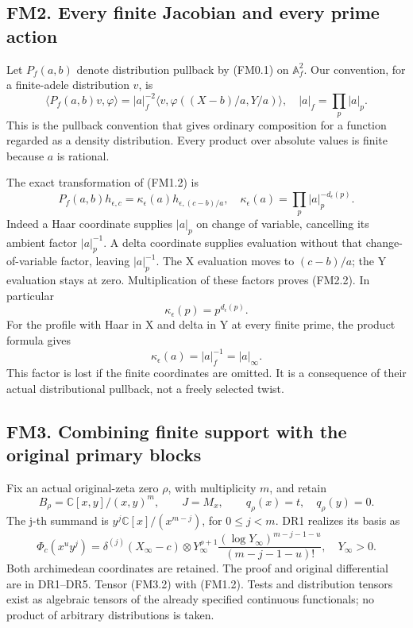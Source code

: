 \subsection{FM2. Every finite Jacobian and every prime
action}\label{fm2.-every-finite-jacobian-and-every-prime-action}

Let \(P_f(a,b)\) denote distribution pullback by (FM0.1) on
\(\mathbb A_f^2\). Our convention, for a finite-adele distribution
\(v\), is \[
\langle P_f(a,b)v,\varphi\rangle
=|a|_f^{-2}\langle v,\varphi((X-b)/a,Y/a)\rangle,
\quad |a|_f=\prod_p|a|_p.
\tag{FM2.1}
\] This is the pullback convention that gives ordinary composition for a
function regarded as a density distribution. Every product over absolute
values is finite because \(a\) is rational.

The exact transformation of (FM1.2) is \[
P_f(a,b)h_{\epsilon,c}
=\kappa_\epsilon(a)h_{\epsilon,(c-b)/a},
\quad
\kappa_\epsilon(a)=\prod_p|a|_p^{-d_\epsilon(p)}.
\tag{FM2.2}
\] Indeed a Haar coordinate supplies \(|a|_p\) on change of variable,
cancelling its ambient factor \(|a|_p^{-1}\). A delta coordinate
supplies evaluation without that change-of-variable factor, leaving
\(|a|_p^{-1}\). The X evaluation moves to \((c-b)/a\); the Y evaluation
stays at zero. Multiplication of these factors proves (FM2.2). In
particular \[
\kappa_\epsilon(p)=p^{d_\epsilon(p)}.
\tag{FM2.3}
\] For the profile with Haar in X and delta in Y at every finite prime,
the product formula gives \[
\kappa_\epsilon(a)=|a|_f^{-1}=|a|_\infty.
\tag{FM2.4}
\] This factor is lost if the finite coordinates are omitted. It is a
consequence of their actual distributional pullback, not a freely
selected twist.

\subsection{FM3. Combining finite support with the original primary
blocks}\label{fm3.-combining-finite-support-with-the-original-primary-blocks}

Fix an actual original-zeta zero \(\rho\), with multiplicity \(m\), and
retain \[
B_\rho=\mathbb C[x,y]/(x,y)^m,\qquad
J=M_x,\qquad q_\rho(x)=t,\quad q_\rho(y)=0.
\tag{FM3.1}
\] The j-th summand is \(y^j\mathbb C[x]/(x^{m-j})\), for \(0\le j<m\).
DR1 realizes its basis as \[
\Phi_c(x^uy^j)=\delta^{(j)}(X_\infty-c)\otimes
Y_\infty^{\rho+1}
\frac{(\log Y_\infty)^{m-j-1-u}}{(m-j-1-u)!},
\quad Y_\infty>0.
\tag{FM3.2}
\] Both archimedean coordinates are retained. The proof and original
differential are in DR1--DR5. Tensor (FM3.2) with (FM1.2). Tests and
distribution tensors exist as algebraic tensors of the already specified
continuous functionals; no product of arbitrary distributions is taken.

